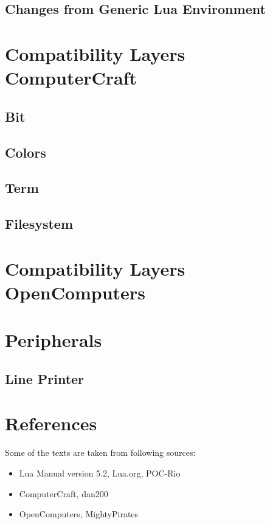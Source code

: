 \documentclass[10pt, stock]{memoir}
\let\oldsection\section
\renewcommand\section{\clearpage\oldsection}
\begin{document}
\section{Changes from Generic Lua Environment}



\chapter[Compatibility Layers---ComputerCraft]{{\LARGE Compatibility Layers} \\ ComputerCraft}

\section{Bit}


\section{Colors}


\section{Term}

\section{Filesystem}



\chapter[Compatibility Layers---OpenComputers]{{\LARGE Compatibility Layers} \\ OpenComputers}



\chapter{Peripherals}

\section{Line Printer}




\chapter{References}

Some of the texts are taken from following sources:

\begin{itemize}
\item Lua Manual version 5.2, Lua.org, POC-Rio
\item ComputerCraft, dan200
\item OpenComputers, MightyPirates
\end{itemize}

\afterpage{\pagestyle{empty}\null\newpage}
\end{document}
